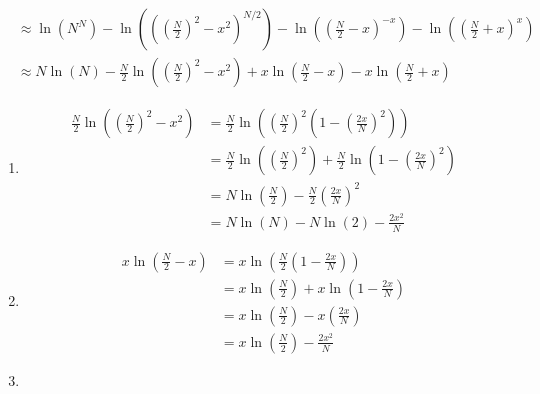 \documentclass{article}
\begin{document}
\begin{enumerate}
\begin{enumerate}
\begin{align*}
                &\approx \ln(N^N) - \ln\left( \left( \left( \frac{N}{2} \right)^2 - x^2 \right)^{N/2} \right) - \ln\left( \left( \frac{N}{2} - x \right)^{-x} \right) - \ln\left( \left( \frac{N}{2} + x \right)^x \right) \\
                &\approx N\ln(N) - \frac{N}{2}\ln\left( \left( \frac{N}{2} \right)^2 - x^2 \right) + x\ln\left( \frac{N}{2} - x \right) - x\ln\left( \frac{N}{2} + x \right)
            \end{align*}
            \begin{enumerate}
                \item 
                \begin{align*}
                    \frac{N}{2}\ln\left( \left( \frac{N}{2} \right)^2 - x^2 \right) &= \frac{N}{2}\ln\left( \left( \frac{N}{2} \right)^2 \left( 1 - \left( \frac{2x}{N} \right)^2 \right) \right) \\
                    &= \frac{N}{2}\ln\left( \left( \frac{N}{2} \right)^2 \right) + \frac{N}{2}\ln\left( 1 - \left( \frac{2x}{N} \right)^2 \right) \\
                    &= N\ln\left( \frac{N}{2} \right) - \frac{N}{2}\left( \frac{2x}{N} \right)^2 \\
                    &= N\ln(N) - N\ln(2) - \frac{2x^2}{N}
                \end{align*}
                \vspace{0.05in}
                \item
                \begin{align*}
                    x\ln\left( \frac{N}{2} - x \right) &= x\ln\left( \frac{N}{2} \left( 1 - \frac{2x}{N} \right) \right) \\
                    &= x\ln\left( \frac{N}{2} \right) + x\ln\left( 1 - \frac{2x}{N} \right) \\
                    &= x\ln\left( \frac{N}{2} \right) - x\left( \frac{2x}{N} \right) \\
                    &= x\ln\left( \frac{N}{2} \right) - \frac{2x^2}{N}
                \end{align*}
                \vspace{0.05in}
                \item
                \begin{align*}

\end{align*}
\end{enumerate}
\end{enumerate}
\end{enumerate}
\end{document}
